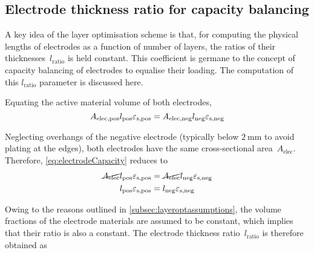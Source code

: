 
\subsection{Electrode thickness ratio for capacity balancing}\label{sec:electroderatio}

A key idea of the layer optimisation  scheme is that, for computing the physical
lengths of  electrodes as a  function of number of  layers, the ratios  of their
thicknesses~$l_\text{ratio}$ is  held constant.  This coefficient is  germane to
the concept of  capacity balancing of electrodes to equalise  their loading. The
computation of this $l_\text{ratio}$ parameter is discussed here.

Equating  the active material volume of both electrodes,
\begin{equation}
    A_\text{elec,pos}l_\text{pos}  \varepsilon_\text{s,pos} = A_\text{elec,neg}l_\text{neg}  \varepsilon_\text{s,neg} \label{eq:electrodeCapacity}\\
\end{equation}

Neglecting   overhangs    of   the    negative   electrode    (typically   below
$\SI{2}{\milli\meter}$    to    avoid    plating    at    the    edges),    both
electrodes  have  the   same  cross-sectional  area~$A_\text{elec}$.  Therefore,
\cref{eq:electrodeCapacity} reduces to
\begin{align}
    \cancel{A_\text{elec}}l_\text{pos}  \varepsilon_\text{s,pos} & = \cancel{A_\text{elec}}l_\text{neg}  \varepsilon_\text{s,neg}  \\
    l_\text{pos}  \varepsilon_\text{s,pos}                       & = l_\text{neg}  \varepsilon_\text{s,neg}\label{eq:electrodeCapequalarea}
\end{align}


Owing to  the reasons outlined in  \cref{subsec:layeroptassumptions}, the volume
fractions  of  the  electrode  materials  are  assumed  to  be  constant,  which
implies  that  their   ratio  is  also  a  constant.   The  electrode  thickness
ratio~$l_\text{ratio}$ is therefore obtained as

